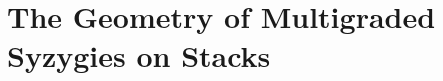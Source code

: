 \documentclass[11pt,reqno]{amsart}
\theoremstyle{remark}
\begin{document}
%
%


\section{The Geometry of Multigraded Syzygies on Stacks}\label{sec:syzygies-on-stacks}
\end{document}
